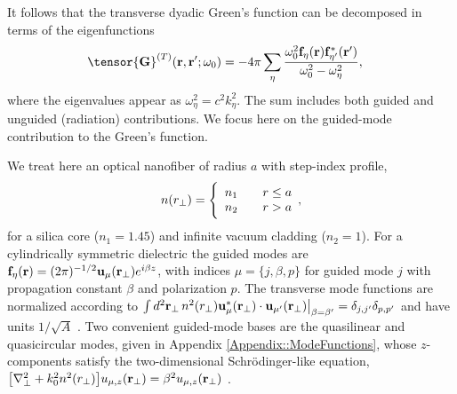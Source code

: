 \documentclass[preprint,aps,pra,onecolumn]{revtex4-1} %
\newcommand{\fidx}{\eta}
\newcommand{\eigenf}{\mbf{f}_\fidx}
\newcommand{\eigenfp}{\mbf{f}_{\fidx'}}
\begin{document}
It follows that the transverse dyadic Green's function can be decomposed in terms of the eigenfunctions~\cite{sakoda_optical_1996, sondergaard_general_2001}
	\begin{align}
		\tensor{\mathbf{G}}^{(T)}(\br,\br'; \omega_0)%
	&= -4\pi \sum_{\fidx} \frac{  \omega_0^2 \eigenf (\br) 
\eigenfp^* (\br')}{\omega_0^2-\omega_\fidx^2},
	\end{align}
where the eigenvalues appear as $\omega_\fidx^2 = c^2 k_\fidx^2$.  The sum includes both guided and unguided (radiation) contributions. We focus here on the guided-mode contribution to the Green's function. 

We treat here an optical nanofiber of radius $a$ with step-index profile,
	\begin{align} \label{Eq::IndexofRefraction}
		n(r_\perp) = \Bigg\{  
			\begin{array}{l l} n_1 & \quad r \leq a \\
						 n_2 & \quad r > a 
		\end{array},
	\end{align}
for a silica core ($n_1 = 1.45$) and infinite vacuum cladding ($n_2 = 1$).  For a cylindrically symmetric dielectric the guided modes are $\eigenf (\br) = (2\pi)^{-1/2} \mathbf{u}_\mu (\br_\perp) e^{i\beta z}$, with indices $\mu=\{j, \beta, p\}$ for guided mode $j$ with propagation constant $\beta$ and polarization $p$.  The transverse mode functions are normalized according to $\int d^2 \mathbf{r}_\perp \, n^2(r_\perp)\mathbf{u}^*_\mu (\mathbf{r}_\perp) \cdot \mathbf{u}_{\mu'} (\mathbf{r}_\perp)\big|_{\beta = \beta'} = \delta_{j,j'}\delta_{p,p'}$ and have units $1/\sqrt{A}$ \cite{le_kien_anisotropy_2014}.  Two convenient guided-mode bases are the quasilinear and quasicircular modes, given in  Appendix \ref{Appendix::ModeFunctions}, whose $z$-components satisfy the two-dimensional Schr\"{o}dinger-like equation, $\big[\nabla_\perp^2 +k_0^2 n^2(r_\perp) \big] u_{\mu,z} (\mathbf{r}_\perp) = \beta^2 u_{\mu,z} (\mathbf{r}_\perp)$ \cite{kien_field_2004}.  
\end{document}
